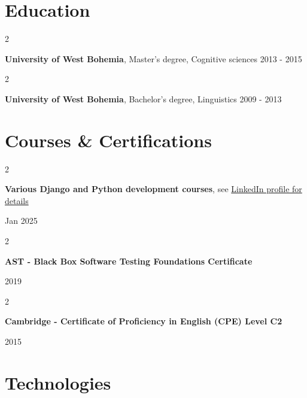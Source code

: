 \documentclass[10pt, a4paper]{article}
\newenvironment{twocolentry}[2][]{
    \onecolentry
    \def\secondColumn{#2}
    \setcolumnwidth{\fill, 4.5 cm}
    \begin{paracol}{2}
}{
    \switchcolumn \raggedleft \secondColumn
    \end{paracol}
    \endonecolentry
} %
\let\hrefWithoutArrow\href
\begin{document}
    \section{Education}

        \begin{twocolentry}{
            \small2013 - 2015
        }
            \textbf{University of West Bohemia}, Master's degree, Cognitive sciences\end{twocolentry}

        \vspace{0.10 cm}

        \begin{twocolentry}{
            \small2009 - 2013
        }
            \textbf{University of West Bohemia}, Bachelor's degree, Linguistics\end{twocolentry}

    \vspace{0.2 cm}

    \section{Courses \& Certifications}

        \begin{twocolentry}{
            \small Jan 2025
        }
            \textbf{Various Django and Python development courses}, see \hrefWithoutArrow{https://www.linkedin.com/in/dusanhaustein/details/certifications/}{LinkedIn profile for details}
        \end{twocolentry}

        \vspace{0.10 cm}

        \begin{twocolentry}{
            \small 2019
        }
            \textbf{AST - Black Box Software Testing Foundations Certificate}
        \end{twocolentry}

        \vspace{0.10 cm}

        \begin{twocolentry}{
            \small2015
        }
            \textbf{Cambridge - Certificate of Proficiency in English (CPE) Level C2}
        \end{twocolentry}

        \vspace{0.2 cm}

    \section{Technologies}
\end{document}
